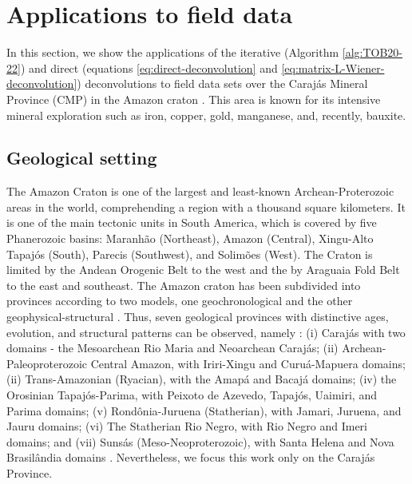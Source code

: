 \section{Applications to field data}
\label{sec:real_data}

In this section, we show the applications of the iterative (Algorithm \ref{alg:TOB20-22}) and direct 
(equations \ref{eq:direct-deconvolution} and \ref{eq:matrix-L-Wiener-deconvolution}) deconvolutions to field data sets 
over the Caraj{\'a}s Mineral Province (CMP) in the Amazon craton \citep{moroni-etal2001,villas-santos2001}. 
This area is known for its intensive mineral exploration such as iron, copper, gold, manganese, and, recently, bauxite.

\subsection{Geological setting}

The Amazon Craton is one of the largest and least-known Archean-Proterozoic areas in the world, comprehending a region with a thousand square kilometers. 
It is one of the main tectonic units in South America, which is covered by five Phanerozoic basins: 
Maranh{\~a}o (Northeast), Amazon (Central), Xingu-Alto Tapaj{\'o}s (South), Parecis (Southwest), and Solim{\~o}es (West). 
The Craton is limited by the Andean Orogenic Belt to the west and the by Araguaia Fold Belt to the east and southeast. 
The Amazon craton has been subdivided into provinces according to two models, one geochronological and the other geophysical-structural 
\citep{amaral1974, teixeira-etal1989, tassinari-macambira1999}. Thus, seven geological provinces with distinctive ages, evolution, and structural 
patterns can be observed, namely : (i) Caraj{\'a}s with two domains - the Mesoarchean Rio Maria and Neoarchean Caraj{\'a}s; 
(ii) Archean-Paleoproterozoic Central Amazon, with Iriri-Xingu and Curuá-Mapuera domains; (ii) Trans-Amazonian (Ryacian), with the Amap{\'a} 
and Bacaj{\'a} domains; (iv) the Orosinian Tapaj{\'o}s-Parima, with Peixoto de Azevedo, Tapaj{\'o}s, Uaimiri, and Parima domains; 
(v) Rond{\^o}nia-Juruena (Statherian), with Jamari, Juruena, and Jauru domains; (vi) The Statherian Rio Negro, with Rio Negro and 
Imeri domains; and (vii) Suns{\'a}s (Meso-Neoproterozoic), with Santa Helena and Nova Brasil{\^a}ndia domains \citep{santos-etal2000}. 
Nevertheless, we focus this work only on the Caraj{\'a}s Province. 

